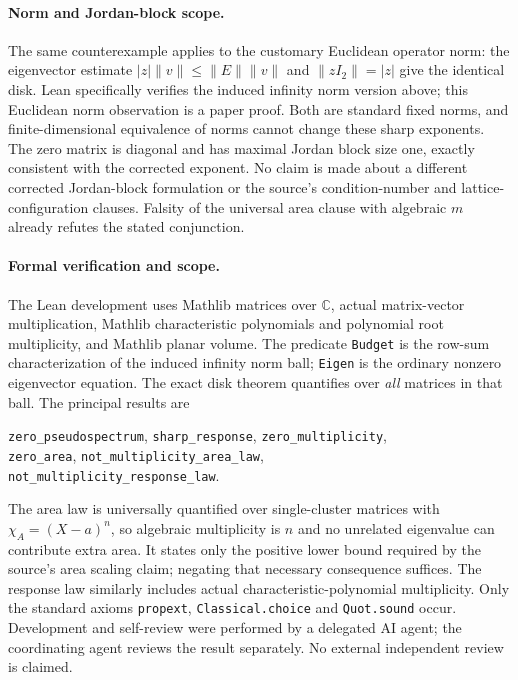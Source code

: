 \documentclass[11pt]{article}
\begin{document}
\paragraph{Norm and Jordan-block scope.}
The same counterexample applies to the customary Euclidean operator
norm: the eigenvector estimate $|z|\|v\|\le\|E\|\|v\|$ and
$\|zI_2\|=|z|$ give the identical disk. Lean specifically verifies
the induced infinity norm version above; this Euclidean norm
observation is a paper proof. Both are standard fixed norms, and
finite-dimensional equivalence of norms cannot change these sharp
exponents. The zero matrix is diagonal and has maximal Jordan block
size one, exactly consistent with the corrected exponent. No claim
is made about a different corrected Jordan-block formulation or
the source's condition-number and lattice-configuration clauses.
Falsity of the universal area clause with algebraic $m$ already
refutes the stated conjunction.

\paragraph{Formal verification and scope.}
The Lean development uses Mathlib matrices over $\mathbb C$, actual
matrix-vector multiplication, Mathlib characteristic polynomials
and polynomial root multiplicity, and Mathlib planar volume. The
predicate \texttt{Budget} is the row-sum characterization of the
induced infinity norm ball; \texttt{Eigen} is the ordinary nonzero
eigenvector equation. The exact disk theorem quantifies over
\emph{all} matrices in that ball. The principal results are
\begin{center}
\texttt{zero\_pseudospectrum}, \texttt{sharp\_response},
\texttt{zero\_multiplicity},\\
\texttt{zero\_area}, \texttt{not\_multiplicity\_area\_law},\\
\texttt{not\_multiplicity\_response\_law}.
\end{center}
The area law is universally quantified over single-cluster matrices
with $\chi_A=(X-a)^n$, so algebraic multiplicity is $n$ and no
unrelated eigenvalue can contribute extra area. It states only the
positive lower bound required by the source's area scaling claim;
negating that necessary consequence suffices. The response law
similarly includes actual characteristic-polynomial multiplicity.
Only the standard axioms \texttt{propext}, \texttt{Classical.choice}
and \texttt{Quot.sound} occur. Development and self-review were
performed by a delegated AI agent; the coordinating agent reviews
the result separately. No external independent review is claimed.
\end{document}
